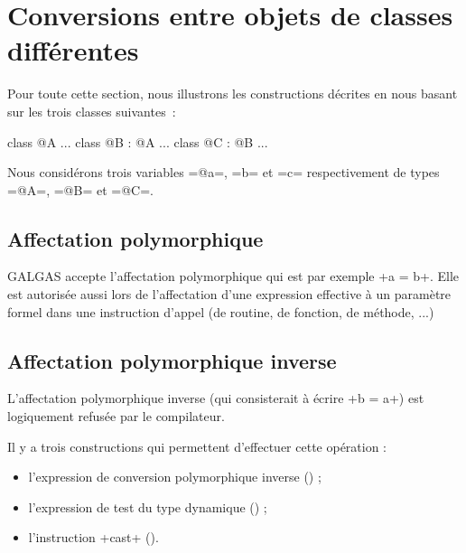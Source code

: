 \section{Conversions entre objets de classes différentes}

Pour toute cette section, nous illustrons les constructions décrites en nous basant sur les trois classes suivantes~:
\begin{galgas}
class @A {
  ...
}
class @B : @A {
  ...
}
class @C : @B {
  ...
}
\end{galgas}

Nous considérons trois variables \ggs=@a=, \ggs=b= et \ggs=c= respectivement de types \ggs=@A=, \ggs=@B= et \ggs=@C=.


\subsection{Affectation polymorphique}

GALGAS accepte l'affectation polymorphique qui est par exemple \ggs+a = b+. Elle est autorisée aussi lors de l'affectation d'une expression effective à un paramètre formel dans une instruction d'appel (de routine, de fonction, de méthode, ...)


\subsection{Affectation polymorphique inverse}

L'affectation polymorphique inverse (qui consisterait à écrire \ggs+b = a+) est logiquement refusée par le compilateur.

Il y a trois constructions qui permettent d'effectuer cette opération :
\begin{itemize}
  \item l'expression de conversion polymorphique inverse () ;
  \item l'expression de test du type dynamique () ;
  \item l'instruction \ggs+cast+ ().
\end{itemize}

